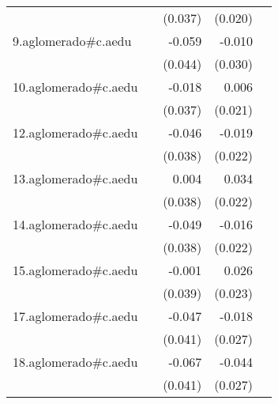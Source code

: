 {\begin{longtable}{l*{4}{D{.}{.}{-1}}}
            &                     &     (0.037)         &     (0.020)         &                     \\
\addlinespace
9.aglomerado#c.aedu&                     &      -0.059         &      -0.010         &                     \\
            &                     &     (0.044)         &     (0.030)         &                     \\
\addlinespace
10.aglomerado#c.aedu&                     &      -0.018         &       0.006         &                     \\
            &                     &     (0.037)         &     (0.021)         &                     \\
\addlinespace
12.aglomerado#c.aedu&                     &      -0.046         &      -0.019         &                     \\
            &                     &     (0.038)         &     (0.022)         &                     \\
\addlinespace
13.aglomerado#c.aedu&                     &       0.004         &       0.034         &                     \\
            &                     &     (0.038)         &     (0.022)         &                     \\
\addlinespace
14.aglomerado#c.aedu&                     &      -0.049         &      -0.016         &                     \\
            &                     &     (0.038)         &     (0.022)         &                     \\
\addlinespace
15.aglomerado#c.aedu&                     &      -0.001         &       0.026         &                     \\
            &                     &     (0.039)         &     (0.023)         &                     \\
\addlinespace
17.aglomerado#c.aedu&                     &      -0.047         &      -0.018         &                     \\
            &                     &     (0.041)         &     (0.027)         &                     \\
\addlinespace
18.aglomerado#c.aedu&                     &      -0.067         &      -0.044         &                     \\
            &                     &     (0.041)         &     (0.027)         &                     \\

\end{longtable}}
